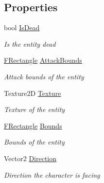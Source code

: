 \subsection*{Properties}
\begin{DoxyCompactItemize}
\item 
bool \hyperlink{class_hel_project_1_1_game_world_1_1_entities_1_1_h_entity_a5ca32a01d263b7bc52df0f2458f5fe06}{Is\+Dead}
\begin{DoxyCompactList}\small\item\em Is the entity dead \end{DoxyCompactList}\item 
\hyperlink{class_hel_project_1_1_tools_1_1_f_rectangle}{F\+Rectangle} \hyperlink{class_hel_project_1_1_game_world_1_1_entities_1_1_h_entity_ac17e8931e8d6412e9e77ff6029ec1ac1}{Attack\+Bounds}
\begin{DoxyCompactList}\small\item\em Attack bounds of the entity \end{DoxyCompactList}\item 
Texture2\+D \hyperlink{class_hel_project_1_1_game_world_1_1_entities_1_1_h_entity_a11ba8f188ffd338f024d396ab0b27cbb}{Texture}
\begin{DoxyCompactList}\small\item\em Texture of the entity \end{DoxyCompactList}\item 
\hyperlink{class_hel_project_1_1_tools_1_1_f_rectangle}{F\+Rectangle} \hyperlink{class_hel_project_1_1_game_world_1_1_entities_1_1_h_entity_a2f205d2e351dadd9c7e4bcfc9b06b970}{Bounds}
\begin{DoxyCompactList}\small\item\em Bounds of the entity \end{DoxyCompactList}\item 
Vector2 \hyperlink{class_hel_project_1_1_game_world_1_1_entities_1_1_h_entity_af5174b1052e65a73b16a4b9530474ce5}{Direction}
\begin{DoxyCompactList}\small\item\em Direction the character is facing \end{DoxyCompactList}\item 

\end{DoxyCompactItemize}
